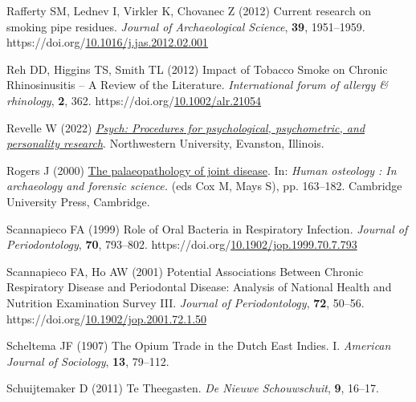 \documentclass[
  11pt,
  leqno]{scrartcl}
\newlength{\cslhangindent}
\newenvironment{CSLReferences}[2] %
 {\begin{list}{}{%
  \setlength{\itemindent}{0pt}
  \setlength{\leftmargin}{0pt}
  \setlength{\parsep}{0pt}
  \ifodd #1
   \setlength{\leftmargin}{\cslhangindent}
   \setlength{\itemindent}{-1\cslhangindent}
  \fi
  \setlength{\itemsep}{#2\baselineskip}}}
 {\end{list}}
\begin{document}
\begin{CSLReferences}{1}{0}
Rafferty SM, Lednev I, Virkler K, Chovanec Z (2012) Current research on
smoking pipe residues. \emph{Journal of Archaeological Science},
\textbf{39}, 1951--1959.
https://doi.org/\href{https://doi.org/10.1016/j.jas.2012.02.001}{10.1016/j.jas.2012.02.001}

Reh DD, Higgins TS, Smith TL (2012) Impact of {Tobacco Smoke} on
{Chronic Rhinosinusitis} -- {A Review} of the {Literature}.
\emph{International forum of allergy \& rhinology}, \textbf{2}, 362.
https://doi.org/\href{https://doi.org/10.1002/alr.21054}{10.1002/alr.21054}

Revelle W (2022)
\emph{\href{https://CRAN.R-project.org/package=psych}{Psych:
{Procedures} for psychological, psychometric, and personality
research}}. {Northwestern University}, {Evanston, Illinois}.

Rogers J (2000)
\href{https://login.ezproxy.leidenuniv.nl:2443/login?URL=https://search.ebscohost.com/login.aspx?direct=true&db=e000xww&AN=40641&site=ehost-live}{The
palaeopathology of joint disease}. In: \emph{Human osteology : {In}
archaeology and forensic science.} (eds Cox M, Mays S), pp. 163--182.
{Cambridge University Press}, {Cambridge}.

Scannapieco FA (1999) Role of {Oral Bacteria} in {Respiratory
Infection}. \emph{Journal of Periodontology}, \textbf{70}, 793--802.
https://doi.org/\href{https://doi.org/10.1902/jop.1999.70.7.793}{10.1902/jop.1999.70.7.793}

Scannapieco FA, Ho AW (2001) Potential {Associations Between Chronic
Respiratory Disease} and {Periodontal Disease}: {Analysis} of {National
Health} and {Nutrition Examination Survey III}. \emph{Journal of
Periodontology}, \textbf{72}, 50--56.
https://doi.org/\href{https://doi.org/10.1902/jop.2001.72.1.50}{10.1902/jop.2001.72.1.50}

Scheltema JF (1907) The {Opium Trade} in the {Dutch East Indies}. {I}.
\emph{American Journal of Sociology}, \textbf{13}, 79--112.

Schuijtemaker D (2011) Te Theegasten. \emph{De Nieuwe Schouwschuit},
\textbf{9}, 16--17.


\end{CSLReferences}
\end{document}
